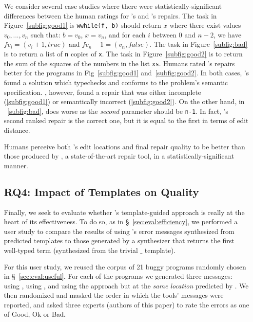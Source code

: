 %
We consider several case studies where there were
statistically-significant differences between
the human ratings for \toolname's and \seminal's
repairs.
%
The task in Figure~\ref{subfig:good1} is
\texttt{wwhile(f, b)} should return $x$ where
there exist values $v_0,...,v_n$ such that:
$b = v_0$, $x = v_n$, and for each $i$ between
0 and $n-2$, we have $f v_i = (v_i+1, true)$
and $f v_n-1 = (v_n, false)$.
%
The task in Figure~\ref{subfig:bad} is to
return a list of \texttt{n} copies of \texttt{x}.
%
The task in Figure~\ref{subfig:good2} is to
return the sum of the squares of the numbers
in the list \texttt{xs}.
%
Humans rated \toolname's repairs better
for the programs in Fig~\ref{subfig:good1}
and~\ref{subfig:good2}.
%
In both cases, \toolname's found a solution
which typechecks and conforms to the problem's
semantic specification.
%
\seminal, however, found a repair that was
either incomplete (\ref{subfig:good1}) or
semantically incorrect (\ref{subfig:good2}).
On the other hand, in ~\ref{subfig:bad}, \toolname
does worse as the \emph{second} parameter should
be \verb|n-1|. In fact, \toolname's second ranked
repair is the correct one, but it is equal
to the first in terms of edit distance.

\begin{framed}
\noindent Humans perceive both \toolname's edit locations
 and final repair quality to be better than those produced
 by \seminal, a state-of-the-art \ocaml repair tool, in a
 statistically-significant manner.
\end{framed}

\subsection{RQ4: Impact of Templates on Quality}

Finally, we seek to evaluate whether \toolname's template-guided
approach is really at the heart of its effectiveness. To do so,
as in \S~\ref{sec:eval:efficiency}, we performed a user study
to compare the results of using \toolname's error messages
synthesized from predicted templates to those generated by
a \naive synthesizer that returns the first well-typed term
(\ie synthesized from the trivial $\_$ template).

%
For this user study, we reused the corpus of 21 buggy programs
randomly chosen in \S~\ref{sec:eval:useful}. For each of the
programs we generated three messages: using \toolname, using \seminal,
and using the \naive approach but at the \emph{same location} predicted
by \toolname. We then randomized and masked the order in which the tools'
messages were reported, and asked three experts (authors of this paper)
to rate the errors as one of Good, Ok or Bad.

